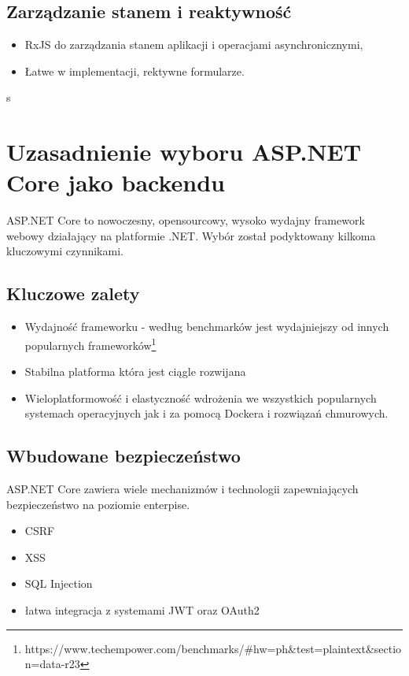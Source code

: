 \subsection{Zarządzanie stanem i reaktywność}
\begin{itemize}
	\item RxJS do zarządzania stanem aplikacji i operacjami asynchronicznymi,
	\item Łatwe w implementacji, rektywne formularze.
\end{itemize}
s
\section{Uzasadnienie wyboru ASP.NET Core jako backendu}

ASP.NET Core to nowoczesny, opensourcowy, wysoko wydajny framework webowy działający na platformie .NET.
Wybór został podyktowany kilkoma kluczowymi czynnikami.

\subsection{Kluczowe zalety}
\begin{itemize}
	\item Wydajność frameworku - według benchmarków jest wydajniejszy od innych popularnych frameworków\footnote{https://www.techempower.com/benchmarks/\#hw=ph\&test=plaintext\&section=data-r23}
	\item Stabilna platforma która jest ciągle rozwijana
	\item Wieloplatformowość i elastyczność wdrożenia we wszystkich popularnych systemach operacyjnych jak i za pomocą Dockera i rozwiązań chmurowych.
\end{itemize}

\subsection{Wbudowane bezpieczeństwo}
ASP.NET Core zawiera wiele mechanizmów i technologii zapewniających bezpieczeństwo na poziomie enterpise.
\begin{itemize}
	\item CSRF
	\item XSS
	\item SQL Injection
	\item łatwa integracja z systemami JWT oraz OAuth2
\end{itemize}

